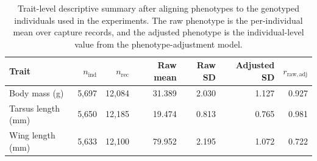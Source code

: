 \begin{table}[H]
\centering
\renewcommand{\arraystretch}{1.08}
\small
\setlength{\tabcolsep}{4pt}
\begin{tabular}{@{}lrrrrrr@{}}
\toprule
\textbf{Trait} & \textbf{$n_{\mathrm{ind}}$} & \textbf{$n_{\mathrm{rec}}$} & \textbf{Raw mean} & \textbf{Raw SD} & \textbf{Adjusted SD} & \textbf{$r_{\mathrm{raw,adj}}$} \\
\midrule
Body mass (g) & 5,697 & 12,084 & 31.389 & 2.030 & 1.127 & 0.927 \\
Tarsus length (mm) & 5,650 & 12,185 & 19.474 & 0.813 & 0.765 & 0.981 \\
Wing length (mm) & 5,633 & 12,100 & 79.952 & 2.195 & 1.072 & 0.722 \\
\bottomrule
\end{tabular}
\caption[Descriptive phenotype summary]{Trait-level descriptive summary after aligning phenotypes to the genotyped individuals used in the experiments. The raw phenotype is the per-individual mean over capture records, and the adjusted phenotype is the individual-level value from the phenotype-adjustment model.}
\label{tab:descriptive_trait_summary}
\end{table}
